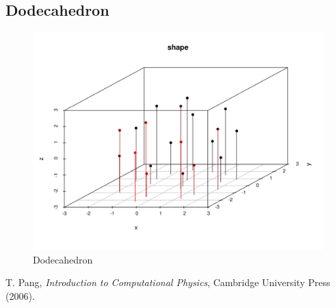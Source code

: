 \documentclass[prb,twocolumn]{revtex4-2}
\begin{document}
\subsection{Dodecahedron}
\begin{figure}[H]
    \centerline{\includegraphics [width=3 in] {img/dodeca.png}}
    \caption{Dodecahedron} \label{q1}
\end{figure}


\begin{thebibliography}{99}

 T. Pang, \emph{Introduction to Computational Physics},
    Cambridge University Press (2006).

\end{thebibliography}
\end{document}
